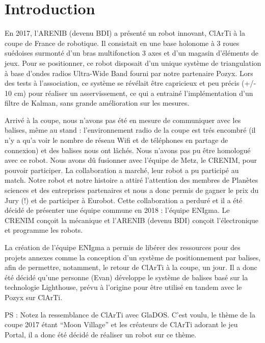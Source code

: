 ﻿\chapter{Introduction}

En 2017, l'ARENIB (devenu BDI) a présenté un robot innovant, ClArTi à la coupe de France de robotique. Il consistait en une base holonome à 3 roues suédoises surmonté d'un bras multifonction 3 axes et d'un magasin d'éléments de jeux. Pour se positionner, ce robot disposait d'un unique système de triangulation à base d'ondes radios Ultra-Wide Band fourni par notre partenaire Pozyx. Lors des tests à l'association, ce système se révélait être capricieux et peu précis (+/- 10 cm) pour réaliser un asservissement, ce qui a entrainé l'implémentation d'un filtre de Kalman, sans grande amélioration sur les mesures.

Arrivé à la coupe, nous n'avons pas été en mesure de communiquer avec les balises, même au stand : l'environnement radio de la coupe est trés encombré (il n'y a qu'a voir le nombre de réseau Wifi et de téléphones en partage de connexion) et des balises nous ont lâchés. Nous n'avons pas pu être homologué avec ce robot. Nous avons dû fusionner avec l'équipe de Metz, le CRENIM, pour pouvoir participer. La collaboration a marché, leur robot a pu participé au match. Notre robot et notre histoire a attiré l'attention des membres de Planètes sciences et des entreprises partenaires et nous a donc permis de gagner le prix du Jury (!) et de participer à Eurobot. Cette collaboration a perduré et il a été décidé de présenter une équipe commune en 2018 : l'équipe ENIgma. Le CRENIM conçoit la mécanique et l'ARENIB (devenu BDI) conçoit l'électronique et programme les robots.

La création de l'équipe ENIgma a permis de libérer des ressources pour des projets annexes comme la conception d'un système de positionnement par balises, afin de permettre, notamment, le retour de ClArTi à la coupe, un jour. Il a donc été décidé qu'une personne (Evan) développe le système de balises basé sur la technologie Lighthouse, prévu à l'origine pour être utilisé en tandem avec le Pozyx sur ClArTi.

PS : Notez la ressemblance de ClArTi avec GlaDOS. C'est voulu, le thème de la coupe 2017 étant "`Moon Village"' et les créateurs de ClArTi adorant le jeu Portal, il a donc été décidé de réaliser un robot sur ce thème.
